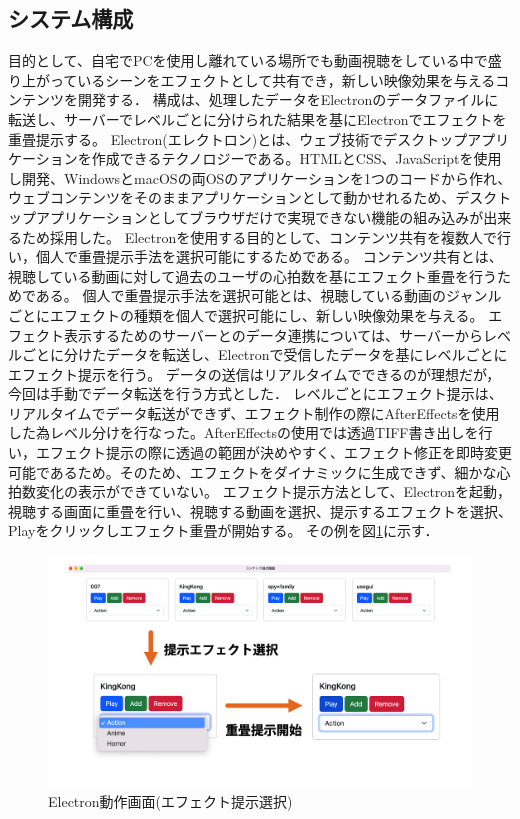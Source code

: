 \subsection{システム構成}
目的として、自宅でPCを使用し離れている場所でも動画視聴をしている中で盛り上がっているシーンをエフェクトとして共有でき，新しい映像効果を与えるコンテンツを開発する．
構成は、処理したデータをElectronのデータファイルに転送し、サーバーでレベルごとに分けられた結果を基にElectronでエフェクトを重畳提示する。
Electron(エレクトロン)とは、ウェブ技術でデスクトップアプリケーションを作成できるテクノロジーである。HTMLとCSS、JavaScriptを使用し開発、WindowsとmacOSの両OSのアプリケーションを1つのコードから作れ、ウェブコンテンツをそのままアプリケーションとして動かせれるため、デスクトップアプリケーションとしてブラウザだけで実現できない機能の組み込みが出来るため採用した。
Electronを使用する目的として、コンテンツ共有を複数人で行い，個人で重畳提示手法を選択可能にするためである。
コンテンツ共有とは、視聴している動画に対して過去のユーザの心拍数を基にエフェクト重畳を行うためである。
個人で重畳提示手法を選択可能とは、視聴している動画のジャンルごとにエフェクトの種類を個人で選択可能にし、新しい映像効果を与える。
エフェクト表示するためのサーバーとのデータ連携については、サーバーからレベルごとに分けたデータを転送し、Electronで受信したデータを基にレベルごとにエフェクト提示を行う。
データの送信はリアルタイムでできるのが理想だが，今回は手動でデータ転送を行う方式とした．
レベルごとにエフェクト提示は、リアルタイムでデータ転送ができず、エフェクト制作の際にAfterEffectsを使用した為レベル分けを行なった。AfterEffectsの使用では透過TIFF書き出しを行い，エフェクト提示の際に透過の範囲が決めやすく、エフェクト修正を即時変更可能であるため。そのため、エフェクトをダイナミックに生成できず、細かな心拍数変化の表示ができていない。
エフェクト提示方法として、Electronを起動，視聴する画面に重畳を行い、視聴する動画を選択、提示するエフェクトを選択、Playをクリックしエフェクト重畳が開始する。
その例を図\ref{efectsentaku}に示す．
 
\begin{figure}[H]
   \centering
   \includegraphics[width=17cm]{images/chapter3/efect_setumei.png}
   \caption{Electron動作画面(エフェクト提示選択)}
   \label{efectsentaku}
\end{figure}
 
